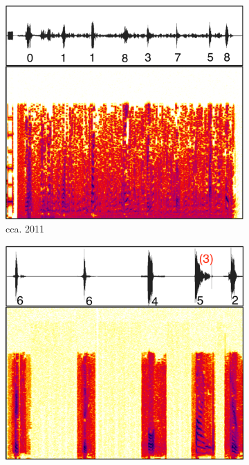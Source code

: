 \begin{figure}[tp]
\begin{subfigure}{0.24\textwidth}
\includegraphics[width=\textwidth]{figures/recaptcha_evolution/2011.pdf}
\caption{\re cca. 2011}
\label{fig:apple}
\end{subfigure} \hspace{0.01\textwidth}
\begin{subfigure}{0.24\textwidth}
\includegraphics[width=\textwidth]{figures/recaptcha_evolution/2014b.pdf}

\end{subfigure}
\end{figure}
